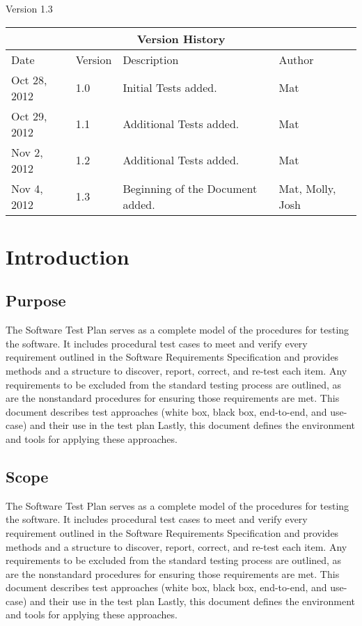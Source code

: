 \documentclass{article}
\title{\Title}
\author{\Author}
\date{\today}
\def\STPVersion{1.3}
\def\Version{\STPVersion}
\newcommand{\setupintro}{
\renewcommand{\thepage}{}
\maketitle
\begin{center}
\large Version \Version \normalsize
\end{center}
\newpage
\setcounter{page}{1}
\renewcommand{\thepage}{\roman{page}}
\tableofcontents 
\newpage
\setcounter{page}{1}
\renewcommand{\thepage}{\arabic{page}}
}
\begin{document}
\setupintro



\begin{tabular}{|l|l|p{3.25in}|l|}
\hline
\multicolumn{4}{|c|}{Version History}\\\hline
Date & Version & Description & Author \\\hline
Oct 28, 2012 & 1.0 & Initial Tests added. & Mat\\\hline
Oct 29, 2012 & 1.1 &Additional Tests added.& Mat \\\hline
Nov 2, 2012 & 1.2 &Additional Tests added.& Mat \\\hline
Nov 4, 2012 & 1.3 &Beginning of the Document added.& Mat, Molly, Josh \\\hline
\end{tabular}

\section{Introduction}

\subsection{Purpose}

The Software Test Plan serves as a complete model of the procedures for testing the software.  It includes procedural test cases to meet and verify every requirement outlined in the Software Requirements Specification and provides methods and a structure to discover, report, correct, and re-test each item.  Any requirements to be excluded from the standard testing process are outlined, as are the nonstandard procedures for ensuring those requirements are met.  This document describes test approaches (white box, black box, end-to-end, and use-case) and their use in the test plan  Lastly, this document defines the environment and tools for applying these approaches.  


\subsection{Scope}

The Software Test Plan serves as a complete model of the procedures for testing the software.  It includes procedural test cases to meet and verify every requirement outlined in the Software Requirements Specification and provides methods and a structure to discover, report, correct, and re-test each item.  Any requirements to be excluded from the standard testing process are outlined, as are the nonstandard procedures for ensuring those requirements are met.  This document describes test approaches (white box, black box, end-to-end, and use-case) and their use in the test plan  Lastly, this document defines the environment and tools for applying these approaches.  
\end{document}
